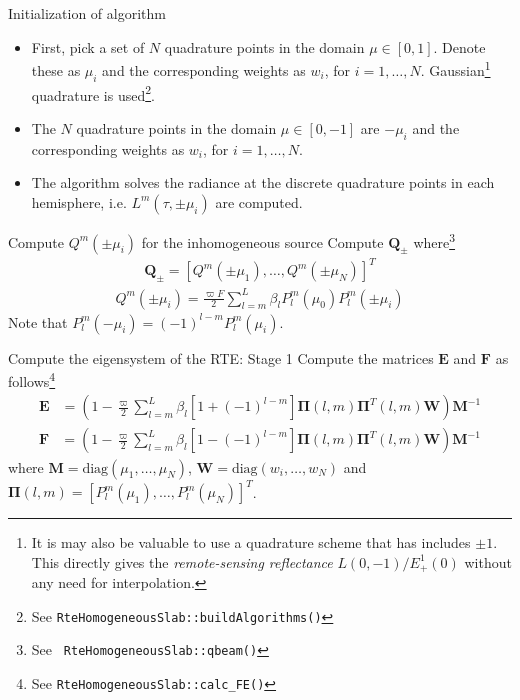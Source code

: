 \documentclass{beamer}
\newcommand{\mvec}[1]{\mathbf{#1}}
\newcommand{\gvec}[1]{\boldsymbol{#1}}
\begin{document}
\begin{frame}{Initialization of algorithm}
  \begin{itemize}
  \item First, pick a set of $N$ quadrature points in the domain $\mu
    \in[0,1]$. Denote these as $\mu_i$ and the corresponding weights
    as $w_i$, for $i=1,\ldots,N$. Gaussian\footnote{It is may also be
      valuable to use a quadrature scheme that has includes $\pm
      1$. This directly gives the \emph{remote-sensing reflectance}
      $L(0,-1)/E_+^1(0)$ without any need for interpolation.}
    quadrature is used\footnote{See {\tt RteHomogeneousSlab::buildAlgorithms()}}.
  \item The $N$ quadrature points in the domain $\mu \in[0,-1]$ are
    $-\mu_i$ and the corresponding weights as $w_i$, for
    $i=1,\ldots,N$.
  \item The algorithm solves the radiance at the discrete quadrature
    points in each hemisphere, i.e. $L^m(\tau,\pm \mu_i)$ are
    computed.
  \end{itemize}
  
\end{frame}

\begin{frame}{Compute $Q^m(\pm \mu_i)$ for the inhomogeneous source}
  Compute $\mvec{Q}_\pm$ where\footnote{See {\tt
      RteHomogeneousSlab::qbeam()}}
  \begin{align}
    \mvec{Q}_\pm = [Q^m(\pm\mu_1), \ldots, Q^m(\pm\mu_N)]^T
  \end{align}
  \begin{align}
    Q^m(\pm \mu_i) = \frac{\varpi F}{2}
    \sum_{l=m}^L \beta_l P^m_l(\mu_0) P_l^m(\pm \mu_i)
  \end{align}
  Note that $P_l^m(-\mu_i) = (-1)^{l-m}P_l^m(\mu_i)$.
\end{frame}

\begin{frame}{Compute the eigensystem of the RTE: Stage 1}
  Compute the matrices $\mvec{E}$ and $\mvec{F}$ as
  follows\footnote{See {\tt RteHomogeneousSlab::calc\_FE()}}
  \begin{align}
    \mvec{E} &= \left(
      1-\frac{\varpi}{2}\sum_{l=m}^L
    \beta_l
    \left[1+(-1)^{l-m}\right] 
    \gvec{\Pi}(l,m) \gvec{\Pi}^T(l,m) \mvec{W}
    \right)
    \mvec{M}^{-1}
  \end{align}
  \begin{align}
    \mvec{F} &= \left(
      1-\frac{\varpi}{2}\sum_{l=m}^L
    \beta_l
    \left[1-(-1)^{l-m}\right] 
    \gvec{\Pi}(l,m) \gvec{\Pi}^T(l,m) \mvec{W}
    \right)
    \mvec{M}^{-1}
  \end{align}
  where $\mvec{M} = \textrm{diag}(\mu_1,\ldots,\mu_N)$, $\mvec{W} =
  \textrm{diag}(w_i,\ldots,w_N)$ and $\gvec{\Pi}(l,m) =
  [P_l^m(\mu_1),\ldots,P_l^m(\mu_N)]^T$.
\end{frame}
\end{document}
